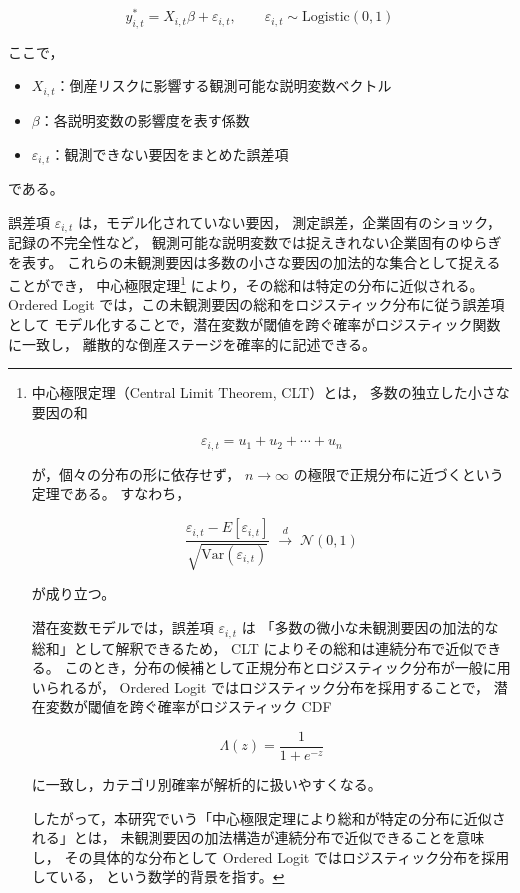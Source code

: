 \[
y^*_{i,t}
=
X_{i,t}\beta + \varepsilon_{i,t},
\qquad
\varepsilon_{i,t} \sim \text{Logistic}(0,1)
\]



ここで，

\begin{itemize}
    \item $X_{i,t}$：倒産リスクに影響する観測可能な説明変数ベクトル  
    \item $\beta$：各説明変数の影響度を表す係数  
    \item $\varepsilon_{i,t}$：観測できない要因をまとめた誤差項  
\end{itemize}

である。

誤差項 $\varepsilon_{i,t}$ は，モデル化されていない要因，
測定誤差，企業固有のショック，記録の不完全性など，
観測可能な説明変数では捉えきれない企業固有のゆらぎを表す。
これらの未観測要因は多数の小さな要因の加法的な集合として捉えることができ，
中心極限定理\footnote{
中心極限定理（Central Limit Theorem, CLT）とは，
多数の独立した小さな要因の和


\[
\varepsilon_{i,t}
=
u_{1} + u_{2} + \cdots + u_{n}
\]


が，個々の分布の形に依存せず，
$n\to\infty$ の極限で正規分布に近づくという定理である。
すなわち，


\[
\frac{\varepsilon_{i,t} - E[\varepsilon_{i,t}]}{\sqrt{\mathrm{Var}(\varepsilon_{i,t})}}
\;\xrightarrow{d}\;
\mathcal{N}(0,1)
\]


が成り立つ。

潜在変数モデルでは，誤差項 $\varepsilon_{i,t}$ は
「多数の微小な未観測要因の加法的な総和」として解釈できるため，
CLT によりその総和は連続分布で近似できる。
このとき，分布の候補として正規分布とロジスティック分布が一般に用いられるが，
Ordered Logit ではロジスティック分布を採用することで，
潜在変数が閾値を跨ぐ確率がロジスティック CDF


\[
\Lambda(z)=\frac{1}{1+e^{-z}}
\]


に一致し，カテゴリ別確率が解析的に扱いやすくなる。

したがって，本研究でいう「中心極限定理により総和が特定の分布に近似される」とは，
未観測要因の加法構造が連続分布で近似できることを意味し，
その具体的な分布として Ordered Logit ではロジスティック分布を採用している，
という数学的背景を指す。
}
により，その総和は特定の分布に近似される。
Ordered Logit では，この未観測要因の総和をロジスティック分布に従う誤差項として
モデル化することで，潜在変数が閾値を跨ぐ確率がロジスティック関数に一致し，
離散的な倒産ステージを確率的に記述できる。

